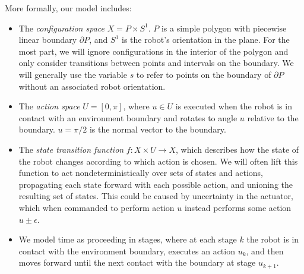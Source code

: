 \documentclass[]{styles/svproc}  %
\begin{document}
More formally, our model includes:

\begin{itemize}
\item The \emph{configuration space} $X = P \times S^1$. $P$ is a simple polygon with 
piecewise linear boundary $\partial P$, and $S^1$ is the robot's orientation in the plane. For the most part, we will ignore configurations in the interior
of the polygon and only consider transitions between points and intervals on the
boundary. We will generally use the variable $s$ to refer to points on
the boundary of $\partial P$ without an associated robot orientation.
\item The \emph{action space} $U = [0,\pi]$, where $u \in U$ is executed when
the robot is in contact with an environment boundary and rotates to angle $u$
relative to the boundary. $u = \pi/2$ is the normal vector to the boundary.
\item The \emph{state transition function} $f: X \times U \to X$, which
describes how the state of the robot changes according to which action is
chosen. We will often lift this function to act nondeterministically over sets
of states and actions, propagating each state forward with each possible action,
and unioning the resulting set of states. This could be caused by uncertainty in
the actuator, which when commanded to perform action $u$ instead performs some
action $u \pm \epsilon$.
\item We model time as proceeding in stages, where at each stage $k$ the robot
is in contact with the environment boundary, executes an action $u_k$, and then
moves forward until the next contact with the boundary at stage $u_{k+1}$.
\end{itemize}
\end{document}
